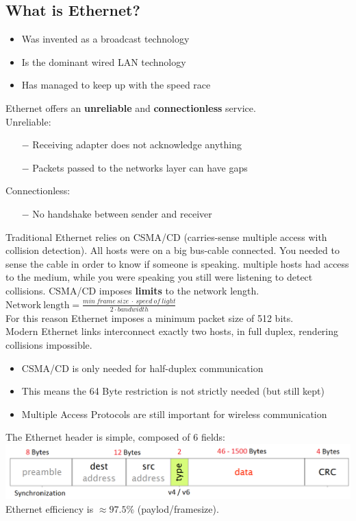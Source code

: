 \documentclass[a4paper, fontsize=8pt, landscape, DIV=1]{scrartcl}
\begin{document}
\begin{multicols*}{4}
   			\subsection{What is Ethernet?}
   			\begin{itemize}[noitemsep]
   				\item Was invented as a broadcast technology
   				\item Is the dominant wired LAN technology 
   				\item Has managed to keep up with the speed race
   			\end{itemize}
   			Ethernet offers an \textbf{unreliable} and \textbf{connectionless} service.\\
   			Unreliable:
   			\begin{itemize}[noitemsep]
   				\item[$-$] Receiving adapter does not acknowledge anything
   				\item[$-$] Packets passed to the networks layer can have gaps
   			\end{itemize}
   			Connectionless: 
   			\begin{itemize}[noitemsep]
   				\item[$-$] No handshake between sender and receiver
   			\end{itemize}
   			Traditional Ethernet relies on CSMA/CD (carries-sense multiple access with collision detection). All hosts were on a big bus-cable connected. You needed to sense the cable in order to know if someone is speaking. multiple hosts had access to the medium, while you were speaking you still were listening to detect collisions. CSMA/CD imposes \textbf{limits} to the network length.\\
   			$\mathrm{Network\ length}=\frac{min\ frame\ size\ \cdot\ speed\ of\ light}{2\cdot bandwidth}$\\
   			For this reason Ethernet imposes a minimum packet size of 512 bits.\\
   			Modern Ethernet links interconnect exactly two hosts, in full duplex, rendering collisions impossible. 
   			\begin{itemize}[noitemsep]
   				\item CSMA/CD is only needed for half-duplex communication
   				\item This means the 64 Byte restriction is not strictly needed (but still kept)
   				\item Multiple Access Protocols are still important for wireless communication
   			\end{itemize}
   			The Ethernet header is simple, composed of 6 fields: 
   			\includegraphics[width=\columnwidth]{images/Link_Layer/eth_header.png}
			Ethernet efficiency is $\approx97.5\%$ (paylod/framesize). 
			

\end{multicols*}
\end{document}

